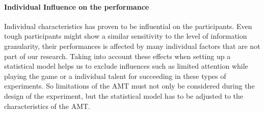 \paragraph{Individual Influence on the performance}
Individual characteristics has proven to be influential on the participants. Even tough participants might show a similar sensitivity to the level of information granularity, their performances is affected by many individual factors that are not part of our research. Taking into account these effects when setting up a statistical model helps us to exclude influences such as limited attention while playing the game or a individual talent for succeeding in these types of experiments. So limitations of the \acl{AMT} must not only be considered during the design of the experiment, but the statistical model has to be adjusted to the characteristics of the \ac{AMT}.


%
%
%
%
%



